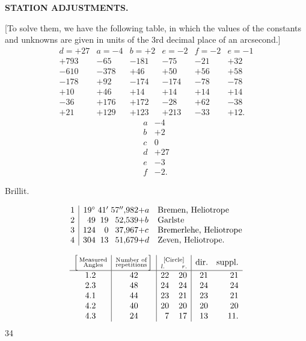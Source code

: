 \par\clearpage
\noindent\null\hfill{\small\textbf{STATION ADJUSTMENTS.}}\hfill{}\par\medskip

[To solve them, we have the following table, in which the values of the constants and unknowns are given in units of the 3rd decimal place of an arcsecond.]
\[
\begin{array}{c|c|c|c|c|c}
 d=+27&a=-4&b=+2&e=-2&f=-2&e=-1\\
 \hline
 +793&-65&-181&-75&-21&+32\\
 -610&-378&+46&+50&+56&+58\\
 -178&+92&-174&-174&-78&-78\\
 +10&+46&+14&+14&+14&+14\\
 -36&+176&+172&-28&+62&-38\\
 +21&+129&+123&+213&-33&+12.
\end{array}
\]
\[
\begin{array}{r|r}
 a&-4\\
 b&+2\\
 c&0\\
 d&+27\\
 e&-3\\
 f&-2.
\end{array}
\]

\medskip
{\centering
[2.]\par{} Brillit.\par{}\par}
\[
\begin{array}{@{}r|r@{\;}r@{\;}r@{}l@{\quad}l@{}}
 1&19^\circ&41'&57''{,}982&+a&\text{Bremen, Heliotrope}\\
 2&49&19&52{,}539&+b&\text{Garlste}\\
 3&124&0&37{,}967&+c&\text{Bremerlehe, Heliotrope}\\
 4&304&13&51{,}679&+d&\text{Zeven, Heliotrope.}
\end{array}
\]
{\par}
{\small
\[
\begin{array}{c|c|rr|rr}
 \Bigl[\,\substack{\text{Measured}\\\text{Angles}}&
 \substack{\text{Number of}\\\text{repetitions}}\,\Bigr]&
 \multicolumn{2}{c|}{\substack{\text{[Circle]}\\\mathit{l.}\qquad\mathit{r.}}}&
 \text{dir.}&\text{suppl.}\\
 \hline
 1.2&42&22&20&21&21\\
 2.3&48&24&24&24&24\\
 4.1&44&23&21&23&21\\
 4.2&40&20&20&20&20\\
 4.3&24&7&17&13&11.
\end{array}
\]
}
\hfill{\small 34}\hspace*{.12\linewidth}\par

